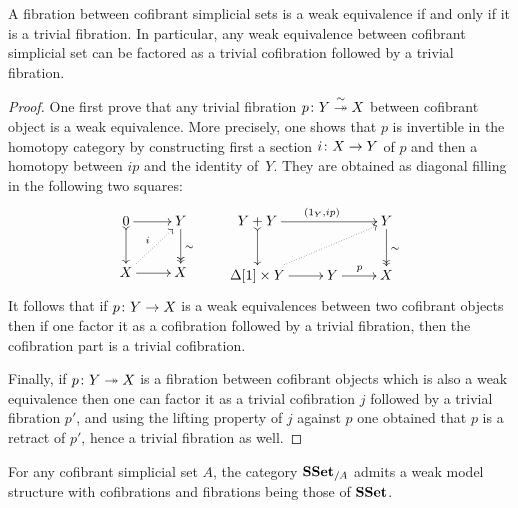 \documentclass[reqno,10pt,a4paper,oneside,draft]{amsart}
\begin{document}
\begin{lemma}\label{lemma:triv_fib_are_we}
A fibration between cofibrant simplicial sets is a weak equivalence if and only if it is a trivial fibration.
In particular, any weak equivalence between cofibrant simplicial set can be factored as a trivial cofibration followed by a trivial fibration.
\end{lemma}

\begin{proof}
One first prove that any trivial fibration  $p \colon Y \overset{\sim}{\twoheadrightarrow} X$ between cofibrant object is a weak equivalence. More precisely, one shows that $p$ is invertible in the homotopy category by constructing first a section $i \colon X \rightarrow Y$ of $p$ and then a homotopy between $i  p$ and the identity 
of~$Y$. They are obtained as diagonal filling in the following two squares:
\[
\xymatrix{0 \ar[r] \ar@{>->}[d] & Y \ar@{->>}[d]^{\sim} \\ X \ar@{.>}[ur]^{i} \ar[r] & X}
\qquad
\xymatrix{Y + Y \ar[rr]^{(1_Y , i  p)} \ar@{>->}[d] & &  Y \ar@{->>}[d]^{\sim} \\ \Delta[1] \times Y \ar@{.>}[rru] \ar[r]& Y \ar[r]^{p} & X  }
\]
It follows that if $p \colon Y \rightarrow X$ is a weak equivalences between two cofibrant objects then if one factor it as a cofibration followed by a trivial fibration, then the cofibration part is a trivial cofibration. 

Finally, if $p \colon Y \twoheadrightarrow X$ is a fibration between cofibrant objects which is also a weak equivalence then one can factor it as a trivial cofibration $j$ followed by a trivial fibration $p'$, and using the lifting property of $j$ against $p$ one obtained that $p$ is a retract of $p'$, hence a trivial fibration as well.
\end{proof}



\begin{corollary}
For any cofibrant simplicial set $A$, the category $\mathbf{SSet}_{/A}$ admits a weak model structure with cofibrations and fibrations  being those of $\mathbf{SSet}$.
\end{corollary}
\end{document}
